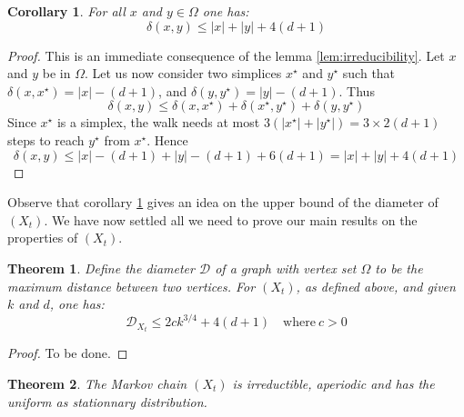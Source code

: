 \documentclass[a4paper]{article}
\newtheorem{theorem}{Theorem}
\newtheorem{corollary}{Corollary}
\begin{document}
\begin{corollary}\label{coro:diameter}
  For all $x$ and $y \in \Omega$ one has:
  \begin{equation}
    \delta(x,y) \leq |x| + |y| + 4(d+1)
  \end{equation}
\end{corollary}

\begin{proof}
  This is an immediate consequence of the lemma \ref{lem:irreducibility}. Let $x$ and $y$ be in $\Omega$. Let us now consider two simplices $x^\star$ and $y^\star$ such that $\delta(x,x^\star) = |x| - (d+1)$, and $\delta(y,y^\star) = |y| - (d+1)$. Thus
  $$
    \delta(x,y) \leq{\delta(x,x^\star) + \delta(x^\star,y^\star) + \delta(y,y^\star)}
  $$
  Since $x^\star$ is a simplex, the walk needs at most $3(|x^\star| + |y^\star|) = 3 \times 2(d+1)$ steps to reach $y^\star$ from $x^\star$. Hence
  $$
    \delta(x,y) \leq{|x| - (d+1) + |y| - (d+1) + 6(d+1)} = |x| + |y| + 4(d+1)
  $$
\end{proof}

Observe that corollary \ref{coro:diameter} gives an idea on the upper bound of the diameter of $(X_t)$. We have now settled all we need to prove our main results on the properties of $(X_t)$.

\begin{theorem}\label{thm:diameter}
  Define the diameter $\mathcal{D}$ of a graph with vertex set $\Omega$ to be the maximum distance between two vertices. For $(X_t)$, as defined above, and given $k$ and $d$, one has:
  \begin{equation}
    \mathcal{D}_{X_t} \leq{2ck^{3/4} + 4(d+1)} \quad \mbox{where} \ c>0
  \end{equation}
\end{theorem}

\begin{proof}
  To be done.
\end{proof}

\begin{theorem}\label{thm:main}
  The Markov chain $(X_t)$ is irreductible, aperiodic and has the uniform as stationnary distribution.
\end{theorem}
\end{document}
